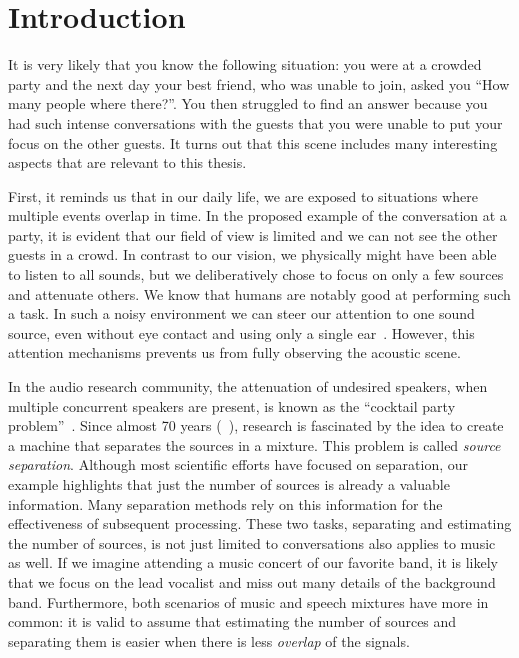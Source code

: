 \chapter{Introduction}\label{ch:introduction}

It is very likely that you know the following situation: you were at a crowded party and the next day your best friend, who was unable to join, asked you ``How many people where there?''. 
You then struggled to find an answer because you had such intense conversations with the guests that you were unable to put your focus on the other guests.
It turns out that this scene includes many interesting aspects that are relevant to this thesis.
\par
First, it reminds us that in our daily life, we are exposed to situations where multiple events overlap in time.
In the proposed example of the conversation at a party, it is evident that our field of view is limited and we can not see the other guests in a crowd.
In contrast to our vision, we physically might have been able to listen to all sounds, but we deliberatively chose to focus on only a few sources and attenuate others.
We know that humans are notably good at performing such a task.
In such a noisy environment we can steer our attention to one sound source, even without eye contact and using only a single ear~\cite{bregman90}.
However, this attention mechanisms prevents us from fully observing the acoustic scene.
\par
In the audio research community, the attenuation of undesired speakers, when multiple concurrent speakers are present, is known as the ``cocktail party problem''~\cite{haykin05}.
Since almost 70 years (~\cite{cherry53}), research is fascinated by the idea to create a machine that separates the sources in a mixture.
This problem is called \emph{source separation}.
Although most scientific efforts have focused on separation, our example highlights that just the number of sources is already a valuable information.
Many separation methods rely on this information for the effectiveness of subsequent processing.
These two tasks, separating and estimating the number of sources, is not just limited to conversations also applies to music as well.
If we imagine attending a music concert of our favorite band, it is likely that we focus on the lead vocalist and miss out many details of the background band.
Furthermore, both scenarios of music and speech mixtures have more in common: it is valid to assume that estimating the number of sources and separating them is easier when there is less \emph{overlap} of the signals.
